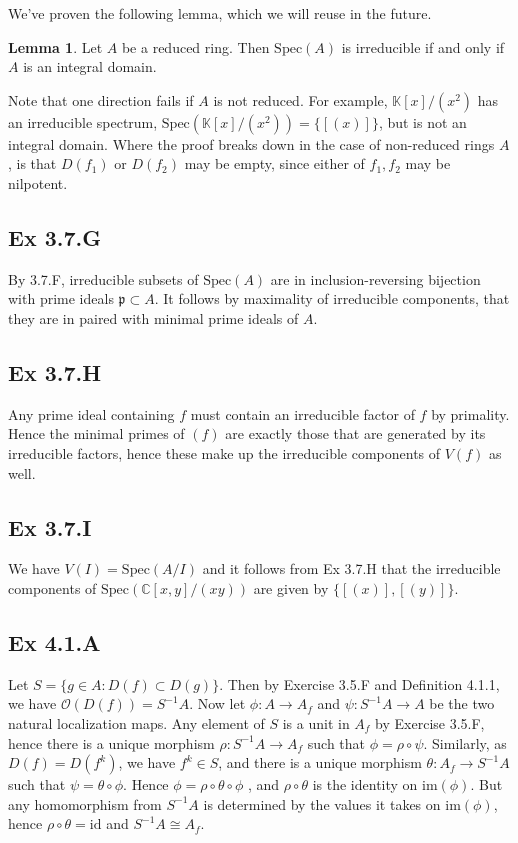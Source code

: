 \documentclass{article}
\theoremstyle{definition}
\newtheorem{lemma}[theorem]{Lemma}
\newcommand{\C}{\mathbb{C}}
\newcommand{\K}{\mathbb{K}}
\newcommand{\Spec}{\text{Spec}}
\newcommand{\im}{\text{im}}
\newcommand{\id}{\text{id}}
\begin{document}
We've proven the following lemma, which we will reuse in the future.
\begin{lemma}
	Let $A$ be a reduced ring. Then $\Spec(A)$ is irreducible if and only if
	$A$ is an integral domain.
\end{lemma}

Note that one direction fails if $A$ is not reduced. For example, $\K[x]/(x^2)$
has an irreducible spectrum, $\Spec(\K[x]/(x^2)) = \{[(x)]\}$, but is not an
integral domain. Where the proof breaks down in the case of non-reduced rings
$A$, is that $D(f_1)$ or $D(f_2)$ may be empty, since either of $f_1, f_2$ may
be nilpotent.


\subsection*{Ex 3.7.G}

By 3.7.F, irreducible subsets of $\Spec(A)$ are in inclusion-reversing
bijection with prime ideals $\mathfrak{p} \subset A$. It follows by maximality
of irreducible components, that they are in paired with minimal prime ideals of
$A$.

\subsection*{Ex 3.7.H}

Any prime ideal containing $f$ must contain an irreducible factor of $f$ by
primality. Hence the minimal primes of $(f)$ are exactly those that are
generated by its irreducible factors, hence these make up the irreducible
components of $V(f)$ as well.

\subsection*{Ex 3.7.I}

We have $V(I) = \Spec(A/I)$ and it follows from Ex 3.7.H that the irreducible
components of $\Spec(\C[x, y]/(xy))$ are given by $\{[(x)], [(y)]\}$.

\subsection*{Ex 4.1.A}

Let $S = \{g \in A : D(f) \subset D(g) \}$. Then by Exercise 3.5.F and
Definition 4.1.1, we have $\mathcal{O}(D(f)) = S^{-1} A$. Now let $\phi : A \to
A_f$ and $\psi : S^{-1}A \to A$ be the two natural localization maps. Any
element of $S$ is a unit in $A_f$ by Exercise 3.5.F, hence there is a unique
morphism $\rho : S^{-1}A \to A_f$ such that $\phi = \rho \circ \psi$.
Similarly, as $D(f) = D(f^k)$, we have $f^k \in S$, and there is a unique
morphism $\theta : A_f \to S^{-1}A$ such that $\psi = \theta \circ \phi$. Hence
$\phi = \rho \circ \theta \circ \phi$ , and $\rho \circ \theta$ is the identity
on $\im(\phi)$. But any homomorphism from $S^{-1}A$ is determined by the values
it takes on $\im(\phi)$, hence $\rho \circ \theta = \id$ and $S^{-1}A \cong
A_f$.
\end{document}
